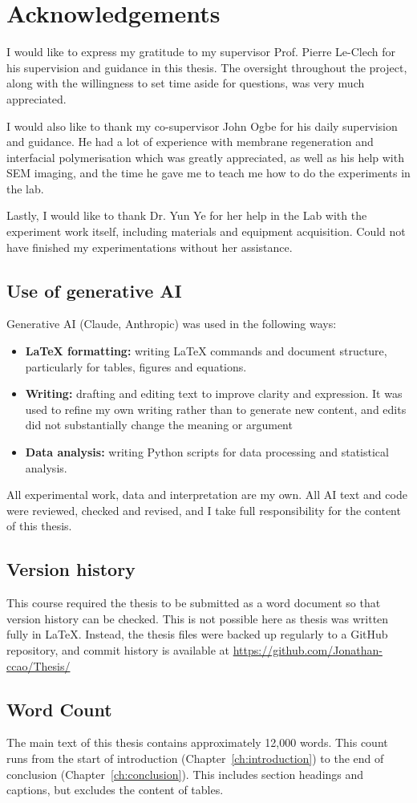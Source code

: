 \chapter*{Acknowledgements}

I would like to express my gratitude to my supervisor Prof. Pierre Le-Clech for his supervision and guidance in this thesis. The oversight throughout the project, along with the willingness to set time aside for questions, was very much appreciated.

I would also like to thank my co-supervisor John Ogbe for his daily supervision and guidance. He had a lot of experience with membrane regeneration and interfacial polymerisation which was greatly appreciated, as well as his help with SEM imaging, and the time he gave me to teach me how to do the experiments in the lab.

Lastly, I would like to thank Dr. Yun Ye for her help in the Lab with the experiment work itself, including materials and equipment acquisition. Could not have finished my experimentations without her assistance. 

\section*{Use of generative AI}
Generative AI (Claude, Anthropic) was used in the following ways:
\begin{itemize}[nosep]
\item \textbf{LaTeX formatting:} writing LaTeX commands and document structure, particularly for tables, figures and equations.
\item \textbf{Writing:} drafting and editing text to improve clarity and expression. It was used to refine my own writing rather than to generate new content, and edits did not substantially change the meaning or argument
\item \textbf{Data analysis:} writing Python scripts for data processing and statistical analysis.
\end{itemize}
All experimental work, data and interpretation are my own. All AI text and code were reviewed, checked and revised, and I take full responsibility for the content of this thesis. 

\section*{Version history}
This course required the thesis to be submitted as a word document so that version history can be checked. This is not possible here as thesis was written fully in LaTeX. Instead, the thesis files were backed up regularly to a GitHub repository, and commit history is available at \url{https://github.com/Jonathan-ccao/Thesis/}

\section*{Word Count}
The main text of this thesis contains approximately 12,000 words. This count runs from the start of introduction (Chapter~\ref{ch:introduction}) to the end of conclusion (Chapter~\ref{ch:conclusion}). This includes section headings and captions, but excludes the content of tables. 